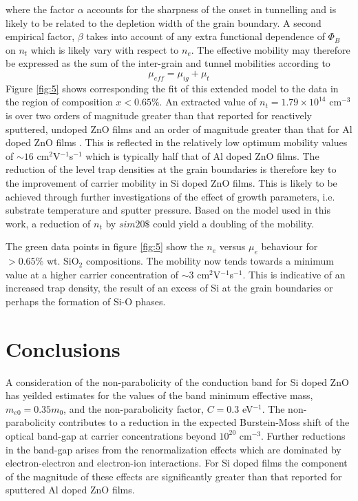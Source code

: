 \documentclass[aps,prl,preprint,showpacs,showkeys,linenumbers]{revtex4-1}
\begin{document}
where the factor $\alpha$ accounts for the sharpness of the onset in tunnelling and is likely to be related to the depletion width of the grain boundary. A second empirical factor, $\beta$ takes into account of any extra functional dependence of $\Phi_B$ on $n_t$ which is likely vary with respect to $n_e$. The effective mobility may therefore be expressed as the sum of the inter-grain and tunnel mobilities according to
\begin{equation}
\label{eqn:14}
\mu_{eff} = \mu_{ig}+\mu_{t}
\end{equation}
Figure \ref{fig:5} shows corresponding the fit of this extended model to the data in the region of composition $x<0.65\%$. An extracted value of $n_t = 1.79\times10^{14}$ cm$^{-3}$ is over two orders of magnitude greater than that reported for reactively sputtered, undoped ZnO films \cite{Carcia2003} and an order of magnitude greater than that for Al doped ZnO films \cite{Shigesato2003}. This is reflected in the relatively low optimum mobility values of $\sim16$ cm$^{2}$V$^{-1}$s$^{-1}$ which is typically half that of Al doped ZnO films. The reduction of the level trap densities at the grain boundaries is therefore key to the improvement of carrier mobility in Si doped ZnO films. This is likely to be achieved through further investigations of the effect of growth parameters, i.e. substrate temperature and sputter pressure. Based on the model used in this work, a reduction of $n_t$ by $sim20\$$ could yield a doubling of the mobility.

The green data points in figure \ref{fig:5} show the $n_e$ versus $\mu_e$ behaviour for $>0.65\%$ wt. SiO$_2$ compositions. The mobility now tends towards a minimum value at a higher carrier concentration of $\sim 3$ cm$^{2}$V$^{-1}$s$^{-1}$. This is indicative of an increased trap density, the result of an excess of Si at the grain boundaries or perhaps the formation of Si-O phases.  

\section{Conclusions}
\label{sec:4}
A consideration of the non-parabolicity of the conduction band for Si doped ZnO has yeilded estimates for the values of the band minimum effective mass, $m_{e0} =0.35m_0$, and the non-parabolicity factor, $C=0.3$ eV$^{-1}$. The non-parabolicity contributes to a reduction in the expected Burstein-Moss shift of the optical band-gap at carrier concentrations beyond $10^{20}$ cm$^{-3}$. Further reductions in the band-gap arises from the renormalization effects which are dominated by electron-electron and electron-ion interactions. For Si doped films the component of the magnitude of these effects are significantly greater than that reported for sputtered Al doped ZnO films.
\end{document}
